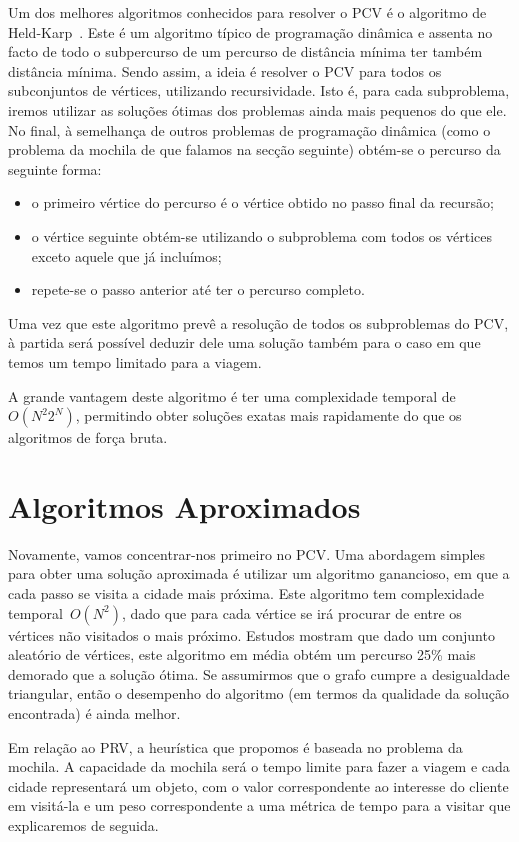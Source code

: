 \documentclass[12pt,a4paper,reqno]{report}
\numberwithin{figure}{section}
\numberwithin{equation}{section}
\numberwithin{figure}{section}
\numberwithin{equation}{section}
\begin{document}
Um dos melhores algoritmos conhecidos para resolver o PCV é o algoritmo de Held-Karp~\cite{Held&Karp:1962}. Este é um algoritmo típico de programação dinâmica e assenta no facto de todo o subpercurso de um percurso de distância mínima ter também distância mínima. Sendo assim, a ideia é resolver o PCV para todos os subconjuntos de vértices, utilizando recursividade. Isto é, para cada subproblema, iremos utilizar as soluções ótimas dos problemas ainda mais pequenos do que ele. No final, à semelhança de outros problemas de programação dinâmica (como o problema da mochila de que falamos na secção seguinte) obtém-se o percurso da seguinte forma:
\begin{itemize}
	\item o primeiro vértice do percurso é o vértice obtido no passo final da recursão;
	\item o vértice seguinte obtém-se utilizando o subproblema com todos os vértices exceto aquele que já incluímos;
	\item repete-se o passo anterior até ter o percurso completo.
\end{itemize}

Uma vez que este algoritmo prevê a resolução de todos os subproblemas do PCV, à partida será possível deduzir dele uma solução também para o caso em que temos um tempo limitado para a viagem.

A grande vantagem deste algoritmo é ter uma complexidade temporal de~$O(N^2 2^N)$, permitindo obter soluções exatas mais rapidamente do que os algoritmos de força bruta.

\section{Algoritmos Aproximados}

Novamente, vamos concentrar-nos primeiro no PCV. Uma abordagem simples para obter uma solução aproximada é utilizar um algoritmo ganancioso, em que a cada passo se visita a cidade mais próxima. Este algoritmo tem complexidade temporal~$O(N^2)$, dado que para cada vértice se irá procurar de entre os vértices não visitados o mais próximo. Estudos mostram que dado um conjunto aleatório de vértices, este algoritmo em média obtém um percurso 25\% mais demorado que a solução ótima. Se assumirmos que o grafo cumpre a desigualdade triangular, então o desempenho do algoritmo (em termos da qualidade da solução encontrada) é ainda melhor.

Em relação ao PRV, a heurística que propomos é baseada no problema da mochila. A capacidade da mochila será o tempo limite para fazer a viagem e cada cidade representará um objeto, com o valor correspondente ao interesse do cliente em visitá-la e um peso correspondente a uma métrica de tempo para a visitar que explicaremos de seguida.
\end{document}
